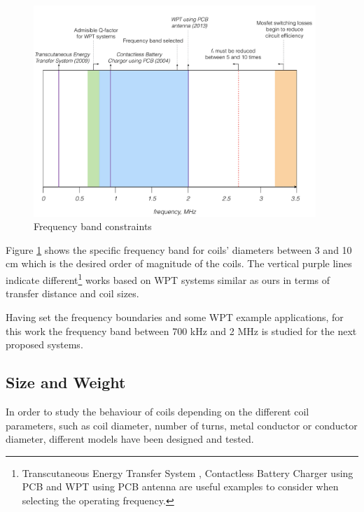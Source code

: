 \begin{figure}[h]
\begin{center}
	\includegraphics[width=0.95\textwidth]{./images/frequency}
\caption{Frequency band constraints}

\label{F:frequency}
\end{center}
\end{figure}

Figure \ref{F:frequency} shows the specific frequency band for coils' diameters between 3 and 10 cm which is the desired order of magnitude of the coils. The vertical purple lines indicate different\footnote{Transcutaneous Energy Transfer System \cite{keynote1}, Contactless Battery Charger using PCB \cite{keynote2} and WPT using PCB antenna \cite{keynote3} are useful examples to consider when selecting the operating frequency.} works based on WPT systems similar as ours in terms of transfer distance and coil sizes.

Having set the frequency boundaries and some WPT example applications, for this work the frequency band between 700 kHz and 2 MHz is studied for the next proposed systems.












\subsection{Size and Weight} 
In order to study the behaviour of coils depending on the different coil parameters, such as coil diameter, number of turns, metal conductor or conductor diameter, different models have been designed and tested.

